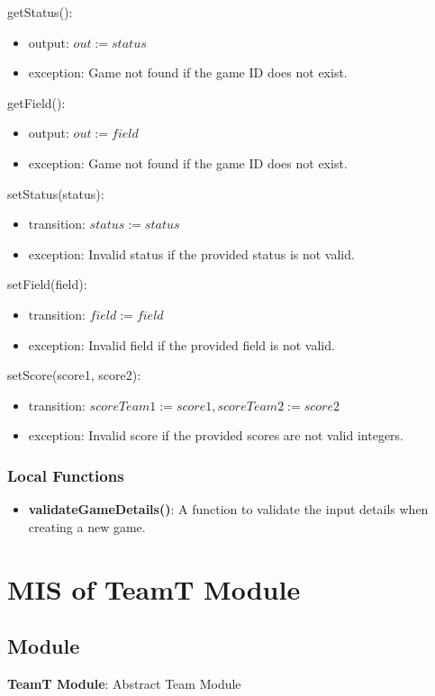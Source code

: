 \documentclass[12pt, titlepage]{article}
\begin{document}
\noindent getStatus():
\begin{itemize}
  \item output: $out := status$
  \item exception: Game not found if the game ID does not exist.
\end{itemize}

\noindent getField():
\begin{itemize}
  \item output: $out := field$
  \item exception: Game not found if the game ID does not exist.
\end{itemize}

\noindent setStatus(status):
\begin{itemize}
  \item transition: $status := status$
  \item exception: Invalid status if the provided status is not valid.
\end{itemize}

\noindent setField(field):
\begin{itemize}
  \item transition: $field := field$
  \item exception: Invalid field if the provided field is not valid.
\end{itemize}

\noindent setScore(score1, score2):
\begin{itemize}
  \item transition: $scoreTeam1 := score1, scoreTeam2 := score2$
  \item exception: Invalid score if the provided scores are not valid integers.
\end{itemize}

\subsubsection{Local Functions}
\begin{itemize}
  \item \textbf{validateGameDetails()}: A function to validate the input details when creating a new game.
\end{itemize}

\section{MIS of TeamT Module} \label{TeamModule}

\subsection{Module}
\textbf{TeamT Module}: Abstract Team Module
\end{document}

